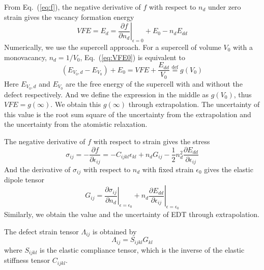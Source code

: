 \documentclass[%
 reprint,
 nofootinbib,
 amsmath,amssymb,
 aps,
]{revtex4-1}
\begin{document}
From Eq.~(\ref{eq:f}), the negative derivative of $f$ with respect to $n_d$ under zero strain gives the vacancy formation energy
\begin{equation}
  \label{eq:VFE0}
  \mathit{VFE} = E_d = \left.\frac{\partial f}{\partial n_d}\right|_{\epsilon = 0} + E_{0} - n_d E_{dd}
\end{equation}
Numerically, we use the supercell approach.
For a supercell of volume $V_0$ with a monovacancy, $n_d=1/V_0$, Eq.~(\ref{eq:VFE0}) is equivalent to
\begin{equation}
  (E_{V_0, d} - E_{V_0}) + E_{0} = \mathit{VFE} + \frac{E_{dd}}{V_0} \stackrel{\mathrm{def}}{=} \mathit{g}(V_0)
\end{equation}
Here $E_{V_0, d}$ and $E_{V_0}$ are the free energy of the supercell with and without the defect respectively.
And we define the expression in the middle as $g(V_0)$, thus $\mathit{VFE} = g(\infty)$.
We obtain this $g(\infty)$ through extrapolation.
The uncertainty of this value is the root sum square of the uncertainty from the extrapolation and the uncertainty from the atomistic relaxation.


The negative derivative of $f$ with respect to strain gives the stress
\begin{equation}
  \label{eq:stress}
  \sigma_{ij} = -\frac{\partial f}{\partial \epsilon_{ij}}
  = -C_{ijkl}\epsilon_{kl} + n_dG_{ij} - \frac{1}{2}n_d^2\frac{\partial E_{dd}}{\partial \epsilon_{ij}}
\end{equation}
And the derivative of $\sigma_{ij}$ with respect to $n_d$ with fixed strain $\epsilon_0$ gives the elastic dipole tensor
\begin{equation}
  \label{eq:EDT}
  G_{ij} = \left.\frac{\partial \sigma_{ij}}{\partial n_d}\right|_{\epsilon = \epsilon_0}
  + n_d \left.\frac{\partial E_{dd}}{\partial \epsilon_{ij}}\right|_{\epsilon = \epsilon_0}
\end{equation}
Similarly, we obtain the value and the uncertainty of EDT through extrapolation.

The defect strain tensor $\Lambda_{ij}$ is obtained by
\begin{equation}
  \label{eq:DST}
  \Lambda_{ij} = S_{ijkl} G_{kl}
\end{equation}
where $S_{ijkl}$ is the elastic compliance tensor, which is the inverse of the elastic stiffness tensor $C_{ijkl}$.
\end{document}
